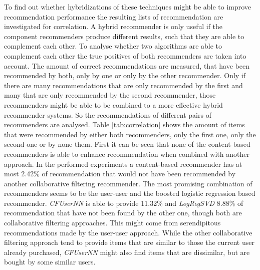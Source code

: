 \documentclass[10pt]{reportMaster}
\begin{document}
To find out whether hybridizations of these techniques might be able to improve recommendation performance the resulting lists of recommendation are investigated for correlation.
A hybrid recommender is only useful if the component recommenders produce different results, such that they are able to complement each other.
To analyse whether two algorithms are able to complement each other the true positives of both recommenders are taken into account.
The amount of correct recommendations are measured, that have been recommended by both, only by one or only by the other recommender.
Only if there are many recommendations that are only recommended by the first and many that are only recommended by the second recommender, those recommenders might be able to be combined to a more effective hybrid recommender systems.
So the recommendations of different pairs of recommenders are analysed.
Table \ref{tab:correlation} shows the amount of items that were recommended by either both recommenders, only the first one, only the second one or by none them.
First it can be seen that none of the content-based recommenders is able to enhance recommendation when combined with another approach.
In the performed experiments a content-based recommender has at most 2.42\% of recommendation that would not have been recommended by another collaborative filtering recommender.
The most promising combination of recommenders seems to be the user-user and the boosted logistic regression based recommender.
\textit{CFUserNN} is able to provide 11.32\% and \textit{LogRegSVD} 8.88\% of recommendation that have not been found by the other one, though both are collaborative filtering approaches.
This might come from serendipitous recommendations made by the user-user approach.
While the other collaborative filtering approach tend to provide items that are similar to those the current user already purchased, \textit{CFUserNN} might also find items that are dissimilar, but are bought by some similar users.
\end{document}
